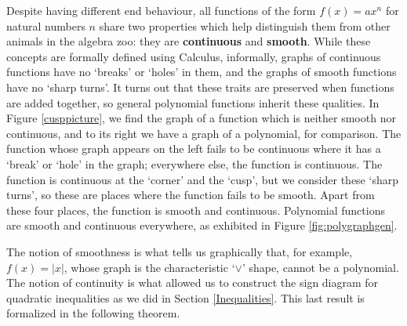 \smallskip

Despite having different end behaviour, all functions of the form $f(x) = ax^{n}$ for natural numbers $n$ share two properties which help distinguish them from other animals in the algebra zoo:  they  are \textbf{continuous} and \textbf{smooth}.  While these concepts are formally defined using Calculus, informally, graphs of continuous functions have no `breaks' or `holes' in them, and the graphs of smooth functions have no `sharp turns'.  It turns out that these traits are preserved when functions are added together, so general polynomial functions inherit these qualities.  In Figure \ref{cusppicture}, we find the graph of a function which is neither smooth nor continuous, and to its right we have a graph of a polynomial, for comparison.  The function whose graph appears on the left fails to be continuous where it has a `break' or `hole' in the graph;  everywhere else, the function is continuous.  The function is continuous at the `corner' and the `cusp', but we consider these `sharp turns', so these are places where the function fails to be smooth.  Apart from these four places, the function is smooth and continuous.  Polynomial functions are smooth and continuous everywhere, as exhibited in Figure \ref{fig:polygraphgen}.






The notion of smoothness is what tells us graphically that, for example, $f(x) = |x|$, whose graph is the characteristic `$\vee$' shape, cannot be a polynomial.  The notion of continuity is what allowed us to construct the sign diagram for quadratic inequalities as we did in Section \ref{Inequalities}.  This last result is formalized in the following theorem.
  
\smallskip


